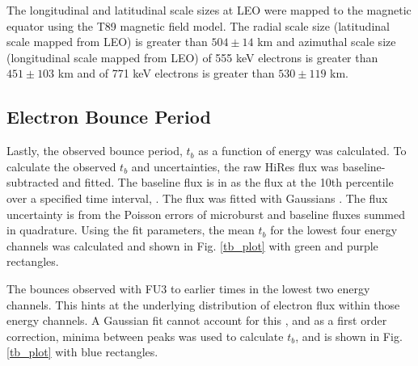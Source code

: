 \documentclass[draft, linenumbers]{agujournal}
\begin{document}
The longitudinal and latitudinal scale sizes  at LEO were mapped to the magnetic equator using the T89 magnetic field model. The radial scale size (latitudinal scale mapped from LEO) is greater than $504 \pm​ 14$ km and azimuthal scale size (longitudinal scale mapped from LEO) of 555 keV electrons is greater than $451 \pm 103$ km and of 771 keV electrons is greater than $530 \pm 119$ km.

\subsection{Electron Bounce Period} \label{t_b} %
Lastly, the observed bounce period, $t_b$ as a function of energy was calculated. To calculate the observed $t_b$ and uncertainties, the raw HiRes flux was baseline-subtracted and fitted. The baseline flux  is  in \citet{O'Brien2004} as the flux at the 10th percentile over a specified time interval, . The flux was fitted with  Gaussians . The flux uncertainty is from the Poisson errors of microburst and baseline fluxes summed in quadrature. Using the fit parameters, the mean $t_b$ for the lowest four energy channels was calculated and shown in Fig. \ref{tb_plot} with green and purple rectangles. 

The bounces observed with FU3  to earlier times in the lowest two energy channels. This hints at the underlying distribution of electron flux within those energy channels.  A Gaussian fit cannot account for this , and as a first order correction, minima between peaks was used to calculate $t_b$, and is shown in Fig. \ref{tb_plot} with blue rectangles. 
\end{document}
